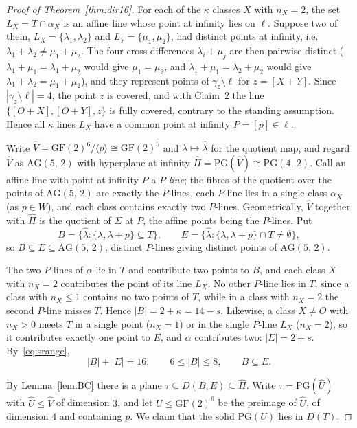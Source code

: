 \documentclass[12pt]{article}
\theoremstyle{definition}
\numberwithin{equation}{section}
\newcommand{\la}{\lambda}
\newcommand{\GF}[1]{\mathrm{GF}(#1)}
\newcommand{\PG}[2]{\mathrm{PG}(#1,\,#2)}
\newcommand{\PGv}[1]{\mathrm{PG}(#1)}
\newcommand{\AG}[2]{\mathrm{AG}(#1,\,#2)}
\begin{document}
\begin{proof}[Proof of Theorem~\ref{thm:dir16}]
\smallskip
For each of the $\kappa$ classes $X$ with $n_X=2$, the set $L_X=T\cap\alpha_X$ is an affine line whose point at infinity lies on $\ell$.  Suppose two of them, $L_X=\{\la_1,\la_2\}$ and $L_Y=\{\mu_1,\mu_2\}$, had distinct points at infinity, i.e.\ $\la_1+\la_2\neq\mu_1+\mu_2$.  The four cross differences $\la_i+\mu_j$ are then pairwise distinct ($\la_1+\mu_1=\la_1+\mu_2$ would give $\mu_1=\mu_2$, and $\la_1+\mu_1=\la_2+\mu_2$ would give
$\la_1+\la_2=\mu_1+\mu_2$), and they represent points of $\gamma_z\setminus\ell$ for $z=[X+Y]$. Since $|\gamma_z\setminus\ell|=4$, the point $z$ is covered, and with Claim~2 the line $\{[O+X],[O+Y],z\}$ is fully covered, contrary to the standing assumption.  Hence all $\kappa$ lines $L_X$ have a common point at infinity $P=[p]\in\ell$.

Write $\widehat V=\GF2^6/\langle p\rangle\cong\GF2^5$ and $\la\mapsto\widehat\la$ for the quotient map, and regard $\widehat V$ as $\AG52$ with hyperplane at infinity $\widehat\Pi=\PGv{\widehat V}\cong\PG42$.  Call an affine line with point at infinity $P$ a \textit{$P$-line}; the fibres of the quotient over the points of $\AG52$ are exactly the $P$-lines, each $P$-line lies in a single class $\alpha_X$ (as $p\in W$), and each class
contains exactly two $P$-lines.  Geometrically, $\widehat V$ together with $\widehat\Pi$ is the quotient of $\Sigma$ at $P$, the affine points being the $P$-lines.  Put
\[
B=\{\widehat\la : \{\la,\la+p\}\subseteq T\},\qquad E=\{\widehat\la : \{\la,\la+p\}\cap T\neq\emptyset\},
\]
so $B\subseteq E\subseteq\AG52$, distinct $P$-lines giving distinct points of $\AG52$.

The two $P$-lines of $\alpha$ lie in $T$ and contribute two points to $B$, and each class $X$ with $n_X=2$ contributes the point of its line $L_X$. No other $P$-line lies in $T$, since a class with $n_X\le1$ contains no two points of $T$, while in a class with $n_X=2$ the second $P$-line misses $T$.  Hence $|B|=2+\kappa=14-s$.  Likewise, a class $X\neq O$ with $n_X>0$ meets $T$ in a single point ($n_X=1$) or
in the single $P$-line $L_X$ ($n_X=2$), so it contributes exactly one point to $E$, and $\alpha$ contributes two: $|E|=2+s$.  By~\eqref{eq:srange},
\[
|B|+|E|=16,\qquad 6\le|B|\le8,\qquad B\subseteq E .
\]

\smallskip
By Lemma~\ref{lem:BC} there is a plane $\tau\subseteq D(B,E)\subseteq\widehat\Pi$. Write $\tau=\PGv{\widehat U}$ with $\widehat U\le\widehat V$ of dimension $3$, and let $U\le\GF2^6$ be the preimage of $\widehat U$, of dimension $4$ and containing $p$.  We claim that the solid $\PGv U$ lies in $D(T)$.


\end{proof}
\end{document}
